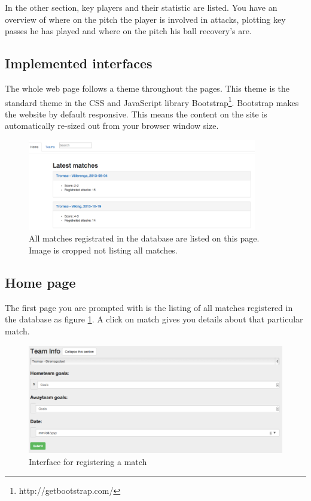 In the other section, key players and their statistic are listed. You have an overview of where on the pitch the player is involved in attacks, plotting key passes he has played and where on the pitch his ball recovery's are.


\subsection{Implemented interfaces}

The whole web page follows a theme throughout the pages. This theme is the standard theme in the \ac{CSS} and JavaScript library Bootstrap\footnote{ http://getbootstrap.com/}. Bootstrap makes the website by default responsive. This means the content on the site is automatically re-sized out from your browser window size.

\begin{figure}[ht!]
\centering
\includegraphics[width=100mm]{images/interfaces/all_matches.png}
\caption{All matches registrated in the database are listed on this page. Image is cropped not listing all matches.}
\label{fig:all_matches}
\end{figure}

\subsection{Home page}
The first page you are prompted with is the listing of all matches registered in the database as figure \ref{fig:all_matches}. A click on match gives you details about that particular match.

\begin{figure}[ht!]
\centering
\includegraphics[width=1\textwidth]{images/demo/reg_match.png}
\caption{Interface for registering a match}
\label{fig:reg_match}
\end{figure}


